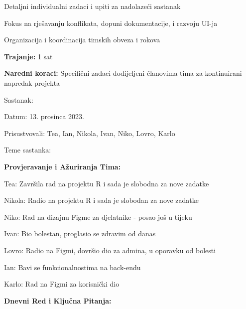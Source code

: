 \begin{packed_enum}
\begin{packed_item}
\begin{packed_item}
                \item Detaljni individualni zadaci i upiti za nadolazeći sastanak
                \item Fokus na rješavanju konflikata, dopuni dokumentacije, i razvoju UI-ja
                \item Organizacija i koordinacija timskih obveza i rokova
            \end{packed_item}
        \item \textbf{Trajanje:} 1 sat
        \item \textbf{Naredni koraci:} Specifični zadaci dodijeljeni članovima tima za kontinuirani napredak projekta
    \end{packed_item}

    \item Sastanak:
    \item[] \begin{packed_item}
        \item Datum: 13. prosinca 2023.
        \item Prisustvovali: Tea, Ian, Nikola, Ivan, Niko, Lovro, Karlo
        \item Teme sastanka:
            \begin{packed_item}
                \item \textbf{Provjeravanje i Ažuriranja Tima:}
                    \begin{packed_item}
                        \item Tea: Završila rad na projektu R i sada je slobodna za nove zadatke
                        \item Nikola: Radio na projektu R i sada je slobodan za nove zadatke
                        \item Niko: Rad na dizajnu Figme za djelatnike - posao još u tijeku
                        \item Ivan: Bio bolestan, proglasio se zdravim od danas
                        \item Lovro: Radio na Figmi, dovršio dio za admina, u oporavku od bolesti
                        \item Ian: Bavi se funkcionalnostima na back-endu
                        \item Karlo: Rad na Figmi za korisnički dio
                    \end{packed_item}
                \item \textbf{Dnevni Red i Ključna Pitanja:}
                    \begin{packed_item}

\end{packed_item}
\end{packed_item}
\end{packed_item}
\end{packed_enum}
